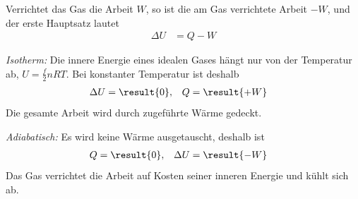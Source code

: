 Verrichtet das Gas die Arbeit $W$, so ist die am Gas verrichtete Arbeit $-W$, und der erste Hauptsatz lautet
\begin{align}
 \Delta U &= Q - W
\end{align}

\emph{Isotherm:} Die innere Energie eines idealen Gases hängt nur von der Temperatur ab, $U = \frac{f}{2}nRT$. Bei konstanter Temperatur ist deshalb
\begin{align}
 \Delta U &= \result{0}, & Q &= \result{+W}
\end{align}
Die gesamte Arbeit wird durch zugeführte Wärme gedeckt.

\emph{Adiabatisch:} Es wird keine Wärme ausgetauscht, deshalb ist
\begin{align}
 Q &= \result{0}, & \Delta U &= \result{-W}
\end{align}
Das Gas verrichtet die Arbeit auf Kosten seiner inneren Energie und kühlt sich ab.
